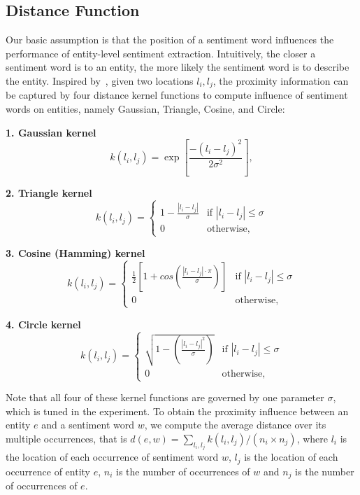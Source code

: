 \documentclass[runningheads]{llncs}
\begin{document}
\subsection{Distance Function}

Our basic assumption is that the position of a sentiment word influences the performance of entity-level sentiment extraction. Intuitively, the closer a sentiment word is to an entity, the more likely the sentiment word is to describe the entity. Inspired by~\cite{Lv2009distancefunction}, given two locations $l_i,l_j$, the proximity information can be captured by four distance kernel functions to compute influence of sentiment words on entities, namely Gaussian, Triangle, Cosine, and Circle:

\textbf{1. Gaussian kernel}
\begin{equation}
    k(l_i,l_j) = \exp\left[\frac{-(l_i-l_j)^2}{2\sigma^2}\right],
\end{equation}

\textbf{2. Triangle kernel}
\begin{equation}
k(l_i,l_j)=\begin{cases}
1-\frac{|l_i-l_j|}{\sigma} &\mbox{if $|l_i-l_j|\leq \sigma$}\\
0 &\mbox{otherwise},
\end{cases}
\end{equation}

\textbf{3. Cosine (Hamming) kernel}
\begin{equation}
k(l_i,l_j)=\begin{cases}
\frac{1}{2}\left[1+cos\left(\frac{|l_i-l_j|\cdot\pi}{\sigma}\right)\right] &\mbox{if $|l_i-l_j|\leq \sigma$}\\
0 &\mbox{otherwise},
\end{cases}
\end{equation}

\textbf{4. Circle kernel}
\begin{equation}
k(l_i,l_j)=\begin{cases}
\sqrt{1-\left(\frac{|l_i-l_j|^2}{\sigma}\right)} &\mbox{if $|l_i-l_j|\leq \sigma$}\\
0 &\mbox{otherwise},
\end{cases}
\end{equation}

Note that all four of these kernel functions are governed by one parameter $\sigma$, which is tuned in the experiment.
To obtain the proximity influence between an entity $e$ and a sentiment word $w$, we compute the average distance over its multiple occurrences, that is $d(e,w)=\sum_{l_i,l_j} k(l_i,l_j)/(n_i\times n_j)$, where $l_i$ is the location of each occurrence of sentiment word $w$, $l_j$ is the location of each occurrence of entity $e$, $n_i$ is the number of occurrences of $w$ and $n_j$ is the number of occurrences of $e$.
\end{document}
